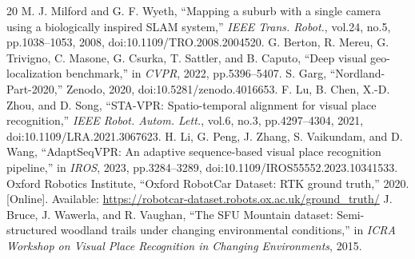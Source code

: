 \documentclass[conference]{IEEEtran}
\begin{document}
\begin{thebibliography}{20}
 M. J. Milford and G. F. Wyeth, ``Mapping a suburb with a single camera using a biologically inspired SLAM system,'' \emph{IEEE Trans. Robot.}, vol.24, no.5, pp.1038--1053, 2008, doi:10.1109/TRO.2008.2004520.
 G. Berton, R. Mereu, G. Trivigno, C. Masone, G. Csurka, T. Sattler, and B. Caputo, ``Deep visual geo-localization benchmark,'' in \emph{CVPR}, 2022, pp.5396--5407.
 S. Garg, ``Nordland-Part-2020,'' Zenodo, 2020, doi:10.5281/zenodo.4016653.
 F. Lu, B. Chen, X.-D. Zhou, and D. Song, ``STA-VPR: Spatio-temporal alignment for visual place recognition,'' \emph{IEEE Robot. Autom. Lett.}, vol.6, no.3, pp.4297--4304, 2021, doi:10.1109/LRA.2021.3067623.
 H. Li, G. Peng, J. Zhang, S. Vaikundam, and D. Wang, ``AdaptSeqVPR: An adaptive sequence-based visual place recognition pipeline,'' in \emph{IROS}, 2023, pp.3284--3289, doi:10.1109/IROS55552.2023.10341533.
 Oxford Robotics Institute, ``Oxford RobotCar Dataset: RTK ground truth,'' 2020. [Online]. Available: \url{https://robotcar-dataset.robots.ox.ac.uk/ground_truth/}
 J. Bruce, J. Wawerla, and R. Vaughan, ``The SFU Mountain dataset: Semi-structured woodland trails under changing environmental conditions,'' in \emph{ICRA Workshop on Visual Place Recognition in Changing Environments}, 2015.

\end{thebibliography}
\end{document}
